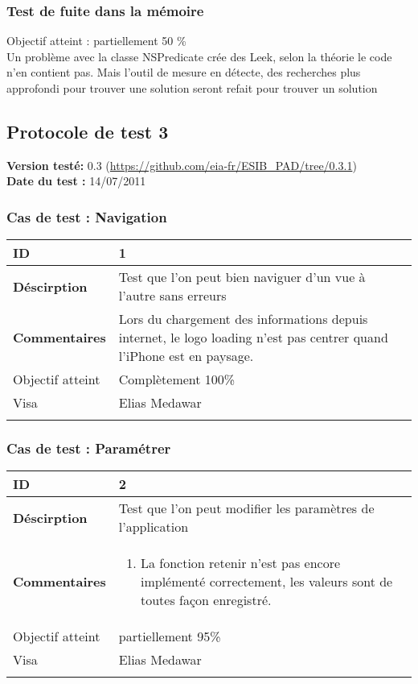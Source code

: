 		 		 \subsubsection*{Test de fuite dans la mémoire}
		 		 Objectif atteint : {\color{red}partiellement 50 \% \CheckedBox}\\
		 		 Un problème avec la classe NSPredicate crée des Leek, selon la théorie le code n'en contient pas. Mais l'outil de mesure en détecte, des recherches plus approfondi pour trouver une solution seront refait pour trouver un solution
		 
		\subsection{Protocole de test 3}
		 		\textbf{Version testé:} 0.3 (\url{https://github.com/eia-fr/ESIB_PAD/tree/0.3.1}) \\
		 		\textbf{	Date du test :} 14/07/2011
		 
		 		\subsubsection*{Cas de test : Navigation}
		 				 \begin{longtable}{m{4cm}|p{10cm}|}
		 				 \textbf{ ID} & 1 \\
		 				 \hline \textbf{Déscirption} & Test que l'on peut bien naviguer d'un vue à l'autre sans erreurs\\
		 				 \hline \textbf{Commentaires} &Lors du chargement des informations depuis internet, le logo loading n'est pas centrer quand l'iPhone		 est en paysage. \\
		 				 \hline Objectif  atteint & {\color{green} Complètement 100\% \CheckedBox } \\
		 				\hline Visa & Elias Medawar \\	
		 				 \\
		 			 \end{longtable} 
		  		\subsubsection*{Cas de test : Paramétrer}
		 		 \begin{longtable}{m{4cm}|p{10cm}|}
		 		 \textbf{ ID} & 2 \\
		 		 \hline \textbf{Déscirption} & Test que l'on peut modifier les paramètres de l'application\\
		 		 \hline \textbf{Commentaires} & 
		 		 	 	 \begin{enumerate}
		 				  		\item La fonction retenir n'est pas encore implémenté correctement, les valeurs sont de toutes façon enregistré.
		 				  	\end{enumerate} \\
		  				\hline Objectif atteint &  {\color{orange}partiellement 95\% \XBox} \\
		  				\hline Visa & Elias Medawar 	\\
		 		 \\
		 		  \end{longtable} 		 		 
